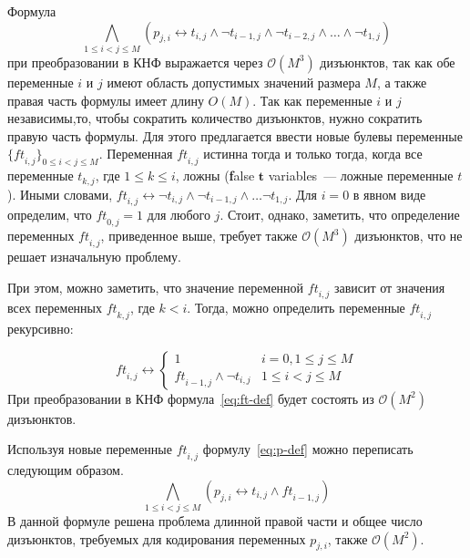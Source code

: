 Формула 
\begin{equation*}
\bigwedge_{1 \leq i < j \leq M} \left(p_{j,i} \leftrightarrow t_{i,j} \wedge \neg t_{i - 1,j} \wedge \neg t_{i - 2, j} \wedge \ldots \wedge \neg t_{1,j}\right)
\end{equation*}
при преобразовании в КНФ выражается через $\mathcal{O}\left(M^{3}\right)$ дизъюнктов, так как обе переменные $i$ и $j$ имеют область допустимых значений размера $M$, а также правая часть формулы имеет длину $O\left(M\right)$.
Так как переменные $i$ и $j$ независимы,то, чтобы сократить количество дизъюнктов, нужно сократить правую часть формулы.
Для этого предлагается ввести новые булевы переменные $\{\mathit{ft}_{i,j}\}_{0 \leq i < j \leq M}$.
Переменная $\mathit{ft}_{i,j}$ истинна тогда и только тогда, когда все переменные $t_{k,j}$, где $1 \leq k \leq i$, ложны (\textbf{f}alse $\boldsymbol{t}$ variables~{---} ложные переменные $t$).
Иными словами, $\mathit{ft}_{i,j} \leftrightarrow \neg t_{i,j} \wedge \neg t_{i - 1, j} \wedge \ldots \neg t_{1,j}$. 
Для $i = 0$ в явном виде определим, что $\mathit{ft}_{0,j} = 1$ для любого $j$.
Стоит, однако, заметить, что определение переменных $\mathit{ft}_{i,j}$, приведенное выше, требует также $\mathcal{O}\left(M^3\right)$ дизъюнктов, что не решает изначальную проблему.

При этом, можно заметить, что значение переменной $\mathit{ft}_{i,j}$ зависит от значения всех переменных $\mathit{ft}_{k,j}$, где $k < i$. Тогда, можно определить переменные $\mathit{ft}_{i,j}$ рекурсивно:

\begin{equation}
\label{eq:ft-def}
  \mathit{ft}_{i,j} \leftrightarrow 
    \begin{cases} 
      1                               & i = 0, 1 \leq j \leq M \\
      \mathit{ft}_{i-1,j} \wedge \neg t_{i,j}  & 1 \leq i < j \leq M
    \end{cases} 
\end{equation}
%
При преобразовании в КНФ формула~\eqref{eq:ft-def} будет состоять из $\mathcal{O}\left(M^{2}\right)$ дизъюнктов.

Используя новые переменные $\mathit{ft}_{i,j}$ формулу~\eqref{eq:p-def} можно переписать следующим образом.
%
\begin{equation}
\label{eq:p-def-tight}
  \bigwedge_{1 \leq i < j \leq M} \left(p_{j,i} \leftrightarrow t_{i,j} \wedge \mathit{ft}_{i-1,j}\right)
\end{equation}
%
В данной формуле решена проблема длинной правой части и общее число дизъюнктов, требуемых для кодирования переменных $p_{j,i}$, также $\mathcal{O}\left(M^{2}\right)$. 

